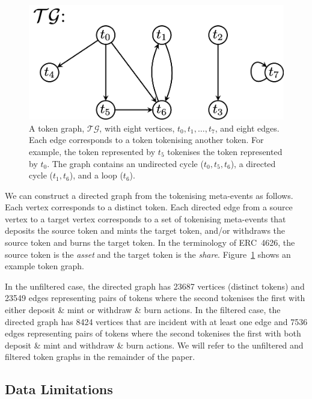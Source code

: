 \begin{figure}
  \centerline{\includegraphics[width=0.8\columnwidth]{img/token-graph/token-graph.png}}
  \caption{A token graph, $\mathcal{TG}$, with eight vertices, $t_0,
    t_1, \ldots, t_7$, and eight edges.  Each edge corresponds to a
    token tokenising another token.  For example, the token
    represented by $t_5$ tokenises the token represented by $t_0$.
    The graph contains an undirected cycle ($t_0, t_5, t_6$), a
    directed cycle ($t_1, t_6$), and a loop ($t_6$).
  }\label{fig:token-graph}
\end{figure}

We can construct a directed graph from the tokenising meta-events as
follows.  Each vertex corresponds to a distinct token.  Each directed
edge from a source vertex to a target vertex corresponds to a set of
tokenising meta-events that deposits the source token and mints the
target token, and/or withdraws the source token and burns the target
token.  In the terminology of ERC~4626, the source token is the
\textit{asset} and the target token is the \textit{share}.
Figure~\ref{fig:token-graph} shows an example token graph.

In the unfiltered case, the directed graph has \num{23687} vertices
(distinct tokens) and \num{23549} edges representing pairs of tokens
where the second tokenises the first with either deposit \& mint or
withdraw \& burn actions.  In the filtered case, the directed graph
has \num{8424} vertices that are incident with at least one edge and
\num{7536} edges representing pairs of tokens where the second
tokenises the first with both deposit \& mint and withdraw \& burn
actions.  We will refer to the unfiltered and filtered token graphs in
the remainder of the paper.

\subsection{Data Limitations}\label{sec:data-limitations}

